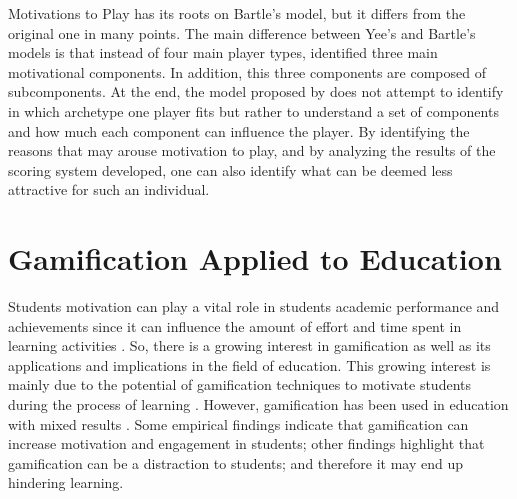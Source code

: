 Motivations to Play \cite{yee2006motivations} has its roots on Bartle's model, but it differs from the original one in many points. 
The main difference between Yee's and Bartle's models is that instead of four main player types, \citeauthor{yee2006motivations} identified three main motivational components.
In addition, this three components are composed of subcomponents.
At the end, the model proposed by \citeauthor{yee2006motivations} does not attempt to identify in which archetype one player fits but rather to understand a set of components and how much each component can influence the player. 
By identifying the reasons that may arouse motivation to play, and by analyzing the results of the scoring system developed, one can also identify what can be deemed less attractive for such an individual. 

\section{Gamification Applied to Education}

Students motivation can play a vital role in students academic performance and achievements since it can influence the amount of effort and time spent in learning activities \cite{linehan2011}. So, there is a growing interest in gamification as well as its applications and implications in the field of education. This growing interest is mainly due to the potential of gamification techniques to motivate students during the process of learning \cite{Borges2014SAC}. 
However, gamification has been used in education with mixed results \cite{Berkling2013,Does_Gamification_Work,Mekler2015,Lieberoth2015,Dichev2017}. Some empirical findings indicate that gamification can increase motivation and engagement in students; other findings highlight that gamification can be a distraction to students; and therefore it may end up hindering learning. 


